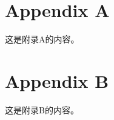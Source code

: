 \begin{appendix}
	\chapter*{Appendix A}
	这是附录A的内容。
	
	\chapter*{Appendix B}
	这是附录B的内容。
\end{appendix}
